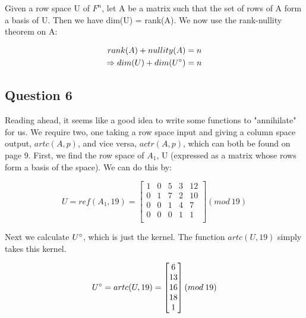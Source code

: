 \documentclass[10pt,a4paper]{report}
\begin{document}
Given a row space U of $F^n$, let A be a matrix such that the set of rows of A form a basis of U. Then we have dim(U) = rank(A). We now use the rank-nullity theorem on A:

\begin{equation*}
\begin{split}
rank(A) + nullity(A) = n \\
\Rightarrow dim(U) + dim(U\degree) = n
\end{split}
\end{equation*}

\subsection*{Question 6}

Reading ahead, it seems like a good idea to write some functions to "annihilate" for us. We require two, one taking a row space input and giving a column space output, $artc(A,p)$, and vice versa, $actr(A,p)$, which can both be found on page 9. First, we find the row space of $A_1$, U (expressed as a matrix whose rows form a basis of the space). We can do this by:

\vspace{5mm}

\begin{equation*}
U=ref(A_1,19)=\begin{bmatrix}
1 & 0 & 5 & 3 & 12 \\
0 & 1 & 7 & 2 & 10\\
0 & 0 & 1 & 4 & 7\\
0 & 0 & 0 & 1 & 1\\
\end{bmatrix} (mod \: 19)
\end{equation*}

\vspace{5mm}

Next we calculate $U\degree$, which is just the kernel. The function $artc(U,19)$ simply takes this kernel.

\vspace{5mm}

\begin{equation*}
U\degree=artc(U,19)=\begin{bmatrix}
6\\
13\\
16\\
18\\
1\\
\end{bmatrix} (mod \: 19)
\end{equation*}
\end{document}
